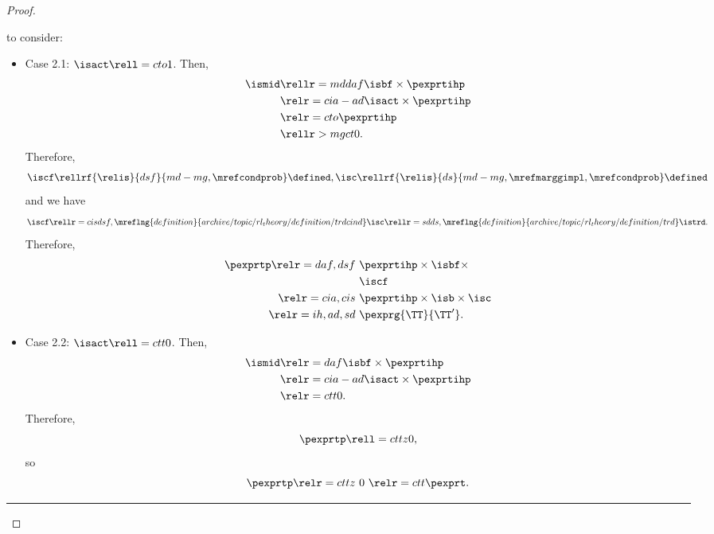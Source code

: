 \begin{proof}
\begin{itemize}
       to consider:
      \begin{itemize}
        \item Case 2.1: $\isact \rell = cto 1$.
          Then,
          \begin{align*}
            \ismid &\rellr = md daf \isbf \times \pexprtihp\\
                   &\relr = cia-ad \isact \times \pexprtihp\\
                   &\relr = cto \pexprtihp\\
                   &\rellr > mg ct 0.
          \end{align*}
          Therefore, 
          $$\iscf \rellrf{\relis}{dsf}{md-mg,\mrefcondprob} \defined,\isc \rellrf{\relis}{ds}{md-mg,\mrefmarggimpl,\mrefcondprob} \defined$$
          and we have
          $$\iscf 
          \rellr = cis dsf,\mreflng{definition}{archive/topic/rl_theory/definition/trdcind} \isc 
          \rellr = sd ds,\mreflng{definition}{archive/topic/rl_theory/definition/trd} \istrd.$$
          Therefore,
          \begin{align*}
            \pexprtp 
            \relr = daf,dsf \ & \pexprtihp \times \isbf \times\\& \iscf\\
            \relr = cia,cis \ & \pexprtihp \times \isb \times \isc\\
            \relr = ih,ad,sd \ & \pexprg{\TT}{\TT'}.
          \end{align*}
        \item Case 2.2: $\isact \rell = ctt 0$.
          Then,
          \begin{align*}
            \ismid &\relr = daf \isbf \times \pexprtihp\\
                   &\relr = cia-ad \isact \times \pexprtihp\\
                   &\relr = ctt 0.
          \end{align*}
          Therefore,
          $$\pexprtp \rell = cttz 0,$$
          so
          $$\pexprtp
          \relr = cttz \ 0 \ 
          \relr = ctt \pexprt.$$
      \end{itemize}
  \end{itemize}
  \hrule
\end{proof}
